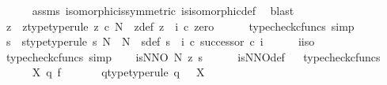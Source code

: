 \begin{isabellebody}
\ \ \ \ \isamarkupfalse%
\ assms\ isomorphic{\isacharunderscore}{\kern0pt}is{\isacharunderscore}{\kern0pt}symmetric\ is{\isacharunderscore}{\kern0pt}isomorphic{\isacharunderscore}{\kern0pt}def\ \isamarkupfalse%
\ blast\ \isanewline
\ \ \isamarkupfalse%
\ z\ \ z{\isacharunderscore}{\kern0pt}type{\isacharbrackleft}{\kern0pt}type{\isacharunderscore}{\kern0pt}rule{\isacharbrackright}{\kern0pt}{\isacharcolon}{\kern0pt}\ {\isachardoublequoteopen}z\ {\isasymin}\isactrlsub c\ N{\isachardoublequoteclose}\ \ z{\isacharunderscore}{\kern0pt}def{\isacharcolon}{\kern0pt}\ {\isachardoublequoteopen}z\ {\isacharequal}{\kern0pt}\ i\ {\isasymcirc}\isactrlsub c\ zero{\isachardoublequoteclose}\isanewline
\ \ \ \ \isamarkupfalse%
\ {\isacharparenleft}{\kern0pt}typecheck{\isacharunderscore}{\kern0pt}cfuncs{\isacharcomma}{\kern0pt}\ simp{\isacharparenright}{\kern0pt}\isanewline
\ \ \isamarkupfalse%
\ s\ \ s{\isacharunderscore}{\kern0pt}type{\isacharbrackleft}{\kern0pt}type{\isacharunderscore}{\kern0pt}rule{\isacharbrackright}{\kern0pt}{\isacharcolon}{\kern0pt}\ {\isachardoublequoteopen}s{\isacharcolon}{\kern0pt}\ N\ {\isasymrightarrow}\ N{\isachardoublequoteclose}\ \ s{\isacharunderscore}{\kern0pt}def{\isacharcolon}{\kern0pt}\ {\isachardoublequoteopen}s\ {\isacharequal}{\kern0pt}\ {\isacharparenleft}{\kern0pt}i\ {\isasymcirc}\isactrlsub c\ successor{\isacharparenright}{\kern0pt}\ {\isasymcirc}\isactrlsub c\ i\isactrlbold {\isasyminverse}{\isachardoublequoteclose}\isanewline
\ \ \ \ \isamarkupfalse%
\ i{\isacharunderscore}{\kern0pt}iso\ \isamarkupfalse%
\ {\isacharparenleft}{\kern0pt}typecheck{\isacharunderscore}{\kern0pt}cfuncs{\isacharcomma}{\kern0pt}\ simp{\isacharparenright}{\kern0pt}\isanewline
\ \ \isamarkupfalse%
\ {\isachardoublequoteopen}is{\isacharunderscore}{\kern0pt}NNO\ N\ z\ s{\isachardoublequoteclose}\isanewline
\ \ \ \ \isamarkupfalse%
\ is{\isacharunderscore}{\kern0pt}NNO{\isacharunderscore}{\kern0pt}def\isanewline
\ \ \isamarkupfalse%
{\isacharparenleft}{\kern0pt}typecheck{\isacharunderscore}{\kern0pt}cfuncs{\isacharparenright}{\kern0pt}\isanewline
\ \ \ \ \isamarkupfalse%
\ X\ q\ f\ \isanewline
\ \ \ \ \isamarkupfalse%
\ q{\isacharunderscore}{\kern0pt}type{\isacharbrackleft}{\kern0pt}type{\isacharunderscore}{\kern0pt}rule{\isacharbrackright}{\kern0pt}{\isacharcolon}{\kern0pt}\ {\isachardoublequoteopen}q{\isacharcolon}{\kern0pt}\ {\isasymone}\ {\isasymrightarrow}\ X{\isachardoublequoteclose}\isanewline

\end{isabellebody}
